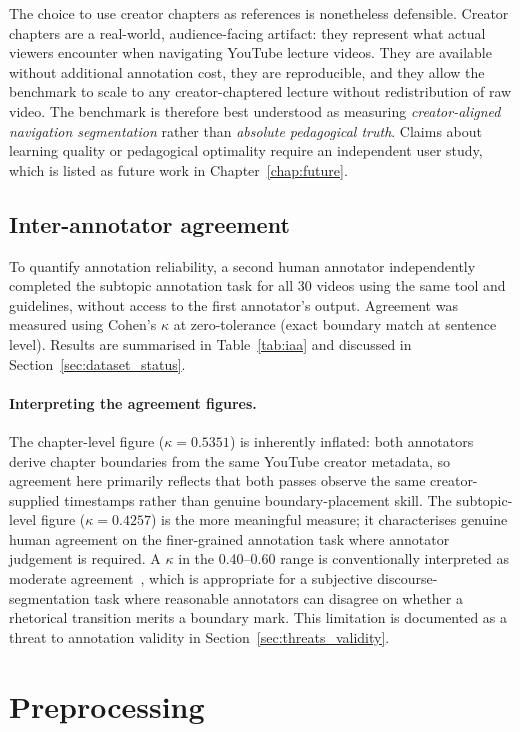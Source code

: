 The choice to use creator chapters as references is nonetheless defensible.
Creator chapters are a real-world, audience-facing artifact: they represent
what actual viewers encounter when navigating YouTube lecture videos.
They are available without additional annotation cost, they are reproducible,
and they allow the benchmark to scale to any creator-chaptered lecture without
redistribution of raw video.
The benchmark is therefore best understood as measuring \emph{creator-aligned
navigation segmentation} rather than \emph{absolute pedagogical truth}.
Claims about learning quality or pedagogical optimality require an independent
user study, which is listed as future work in Chapter~\ref{chap:future}.

\subsection{Inter-annotator agreement}
\label{sec:iaa}

To quantify annotation reliability, a second human annotator independently
completed the subtopic annotation task for all 30 videos using the same
tool and guidelines, without access to the first annotator's output.
Agreement was measured using Cohen's $\kappa$ at zero-tolerance
(exact boundary match at sentence level). Results are summarised in
Table~\ref{tab:iaa} and discussed in Section~\ref{sec:dataset_status}.

\paragraph{Interpreting the agreement figures.}
The chapter-level figure ($\kappa=0.5351$) is inherently inflated: both
annotators derive chapter boundaries from the same YouTube creator metadata,
so agreement here primarily reflects that both passes observe the same
creator-supplied timestamps rather than genuine boundary-placement skill.
The subtopic-level figure ($\kappa=0.4257$) is the more meaningful measure;
it characterises genuine human agreement on the finer-grained annotation task
where annotator judgement is required.
A $\kappa$ in the 0.40--0.60 range is conventionally interpreted as moderate
agreement~\citep{fournier2012}, which is appropriate for a subjective
discourse-segmentation task where reasonable annotators can disagree on
whether a rhetorical transition merits a boundary mark.
This limitation is documented as a threat to annotation validity in
Section~\ref{sec:threats_validity}.

\section{Preprocessing}
\label{sec:preprocess}

